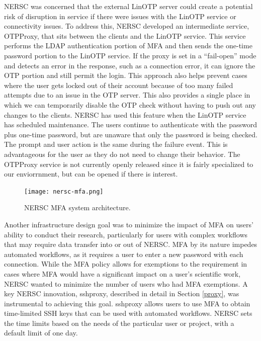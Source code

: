 \documentclass[sigconf,review]{acmart}
\begin{document}
NERSC was concerned that the external LinOTP server could create a potential
risk of disruption in service if there were issues with the LinOTP service or
connectivity issues.  To address this, NERSC developed an intermediate service,
OTPProxy, that sits between the clients and the LinOTP service.  This service
performs the LDAP authentication portion of MFA and then sends the one-time
password portion to the LinOTP service.  If the proxy is set in a ``fail-open''
mode and detects an error in the response, such as a connection error, it can
ignore the OTP portion and still permit the login.  This approach also helps
prevent cases where the user gets locked out of their account because of too
many failed attempts due to an issue in the OTP server.  This also provides a
single place in which we can temporarily disable the OTP check without having to
push out any changes to the clients.  NERSC has used this feature when the
LinOTP service has scheduled maintenance.  The users continue to authenticate
with the password plus one-time password, but are unaware that only the password
is being checked.  The prompt and user action is the same during the failure event.
This is advantageous for the user as they do not need to change their behavior.
The OTPProxy service is not currently openly released since it is fairly specialized
to our enviorrnment, but can be opened if there is interest.

\begin{figure}[h!]
  \centering
  \texttt{[image: nersc-mfa.png]}
  \caption{NERSC MFA system architecture.}
  \label{mfa-diagram}
\end{figure}

Another infrastructure design goal was to minimize the impact of MFA on users'
ability to conduct their research, particularly for users with complex workflows
that may require data transfer into or out of NERSC. MFA by its nature impedes
automated workflows, as it requires a user to enter a new password with each
connection. While the MFA policy allows for exemptions to the requirement in
cases where MFA would have a significant impact on a user's scientific work,
NERSC wanted to minimize the number of users who had MFA exemptions. A key NERSC
innovation, sshproxy, described in detail in Section \ref{proxy}, was
instrumental to achieving this goal. sshproxy allows users to use MFA to obtain
time-limited SSH keys that can be used with automated workflows. NERSC sets the
time limits based on the needs of the particular user or project, with a default
limit of one day.
\end{document}

